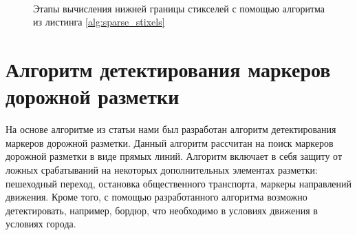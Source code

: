 \documentclass[aps,%
14pt,%
final,%
oneside,
onecolumn,%
musixtex, %
superscriptaddress,%
centertags]{extarticle} %
\begin{document}
\begin{figure}[htp]
\centering
{}\\
\\
\\
\caption{Этапы вычисления нижней границы стикселей с помощью алгоритма из листинга \ref{alg:sparse_stixels}}
\label{fig:sparse_stixels_steps}
\end{figure}

\newpage
\section{Алгоритм детектирования маркеров дорожной разметки}

На основе алгоритме из статьи \cite{aly2008real} нами был разработан алгоритм детектирования маркеров дорожной разметки. Данный алгоритм рассчитан на поиск маркеров дорожной разметки в виде прямых линий. Алгоритм включает в себя защиту от ложных срабатываний на некоторых дополнительных элементах разметки: пешеходный переход, остановка общественного транспорта, маркеры направлений движения. Кроме того, с помощью разработанного алгоритма возможно детектировать, например, бордюр, что необходимо в условиях движения в условиях города.
\end{document}
